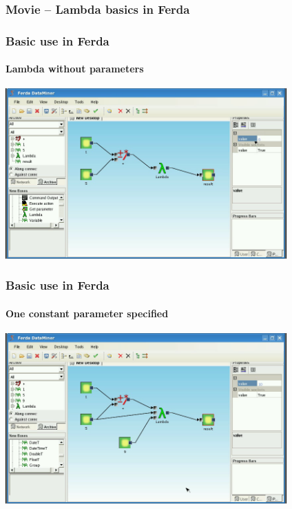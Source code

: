 \documentclass{beamer}
\begin{document}
\begin{frame}
	\frametitle{Movie -- Lambda basics in Ferda}
\end{frame}

\begin{frame}
	\frametitle{Basic use in Ferda}
	\framesubtitle{Lambda without parameters}

	\includegraphics[width=10.8cm]{lambdaBasic2.png}
\end{frame}

\begin{frame}
	\frametitle{Basic use in Ferda}
	\framesubtitle{One constant parameter specified}
	\includegraphics[width=10.8cm]{lambdaBasic3.png}
\end{frame}
\end{document}
